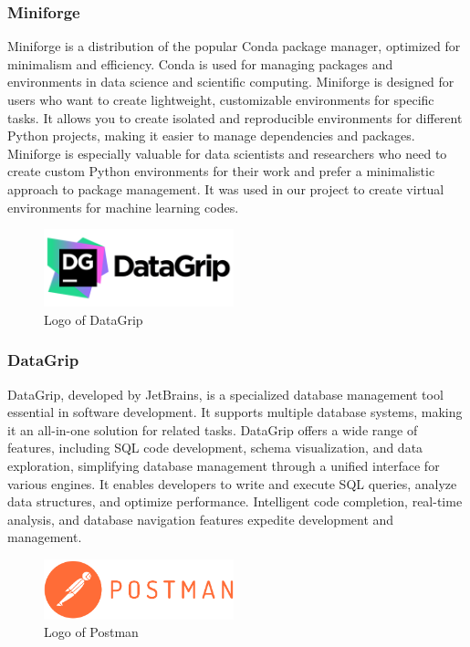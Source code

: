 \documentclass[conference]{IEEEtran}
\begin{document}
        \subsubsection{Miniforge}
        Miniforge is a distribution of the popular Conda package manager, optimized for minimalism and efficiency. Conda is used for managing packages and environments in data science and scientific computing. Miniforge is designed for users who want to create lightweight, customizable environments for specific tasks. It allows you to create isolated and reproducible environments for different Python projects, making it easier to manage dependencies and packages. Miniforge is especially valuable for data scientists and researchers who need to create custom Python environments for their work and prefer a minimalistic approach to package management. It was used in our project to create virtual environments for machine learning codes.\\

        \begin{figure}[htbp]
        \centerline{\includegraphics[width=5.5cm]{Images/logo/datagrip.png}}
        \label{fig}
        \caption{Logo of DataGrip}
        \end{figure}
        \subsubsection{DataGrip}
        DataGrip, developed by JetBrains, is a specialized database management tool essential in software development. It supports multiple database systems, making it an all-in-one solution for related tasks. DataGrip offers a wide range of features, including SQL code development, schema visualization, and data exploration, simplifying database management through a unified interface for various engines. It enables developers to write and execute SQL queries, analyze data structures, and optimize performance. Intelligent code completion, real-time analysis, and database navigation features expedite development and management.\\

        \begin{figure}[htbp]
        \centerline{\includegraphics[width=5.5cm]{Images/logo/postman.png}}
        \label{fig}
        \caption{Logo of Postman}
        \end{figure}
\end{document}
